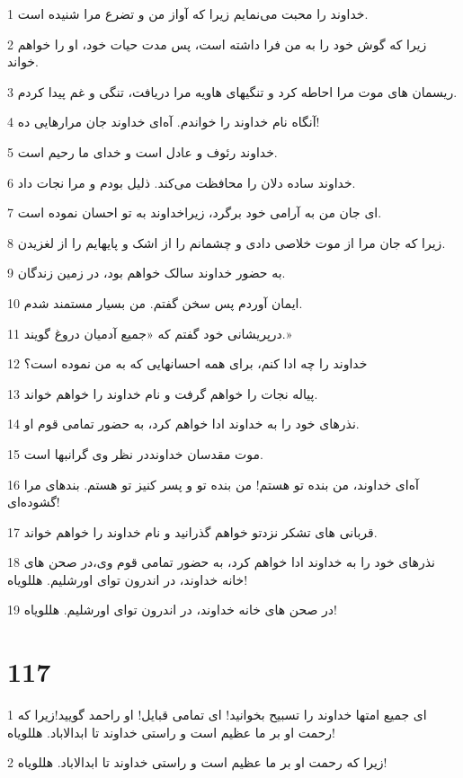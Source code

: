 \par 1 خداوند را محبت می‌نمایم زیرا که آواز من و تضرع مرا شنیده است.
\par 2 زیرا که گوش خود را به من فرا داشته است، پس مدت حیات خود، او را خواهم خواند.
\par 3 ریسمان های موت مرا احاطه کرد و تنگیهای هاویه مرا دریافت، تنگی و غم پیدا کردم.
\par 4 آنگاه نام خداوند را خواندم. آه‌ای خداوند جان مرارهایی ده!
\par 5 خداوند رئوف و عادل است و خدای ما رحیم است.
\par 6 خداوند ساده دلان را محافظت می‌کند. ذلیل بودم و مرا نجات داد.
\par 7 ‌ای جان من به آرامی خود برگرد، زیراخداوند به تو احسان نموده است.
\par 8 زیرا که جان مرا از موت خلاصی دادی و چشمانم را از اشک و پایهایم را از لغزیدن.
\par 9 به حضور خداوند سالک خواهم بود، در زمین زندگان.
\par 10 ایمان آوردم پس سخن گفتم. من بسیار مستمند شدم.
\par 11 درپریشانی خود گفتم که «جمیع آدمیان دروغ گویند.»
\par 12 خداوند را چه ادا کنم، برای همه احسانهایی که به من نموده است؟
\par 13 پیاله نجات را خواهم گرفت و نام خداوند را خواهم خواند.
\par 14 نذرهای خود را به خداوند ادا خواهم کرد، به حضور تمامی قوم او.
\par 15 موت مقدسان خداونددر نظر وی گرانبها است.
\par 16 آه‌ای خداوند، من بنده تو هستم! من بنده تو و پسر کنیز تو هستم. بندهای مرا گشوده‌ای!
\par 17 قربانی های تشکر نزدتو خواهم گذرانید و نام خداوند را خواهم خواند.
\par 18 نذرهای خود را به خداوند ادا خواهم کرد، به حضور تمامی قوم وی،در صحن های خانه خداوند، در اندرون تو‌ای اورشلیم. هللویاه!
\par 19 در صحن های خانه خداوند، در اندرون تو‌ای اورشلیم. هللویاه!
 
\chapter{117}

\par 1 ای جمیع امتها خداوند را تسبیح بخوانید! ای تمامی قبایل! او راحمد گویید!زیرا که رحمت او بر ما عظیم است و راستی خداوند تا ابدالاباد. هللویاه!
\par 2 زیرا که رحمت او بر ما عظیم است و راستی خداوند تا ابدالاباد. هللویاه!
 
